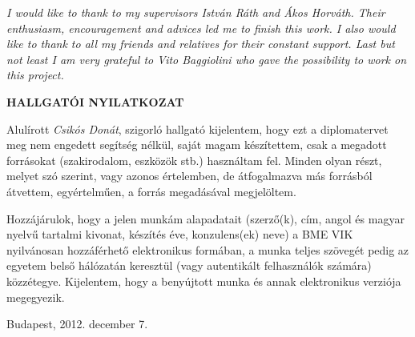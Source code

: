 \emph{I would like to thank to my supervisors István Ráth and Ákos Horváth.
 Their enthusiasm, encouragement and advices led me to finish this work.
 I also would like to thank to all my friends and relatives for their constant
 support. Last but not least I am very grateful to Vito Baggiolini who
  gave the possibility to work on this project.}
\vfill \clearpage


\begin{center} 
\large
\textbf{HALLGATÓI NYILATKOZAT}\\
\end{center}

Alulírott \emph{Csikós Donát}, szigorló hallgató kijelentem, hogy ezt a
diplomatervet meg nem  engedett segítség
nélkül, saját magam készítettem, csak a megadott forrásokat (szakirodalom,
eszközök stb.) használtam fel. Minden olyan részt, melyet szó szerint, vagy
azonos értelemben, de átfogalmazva más forrásból átvettem, egyértelműen, a
forrás megadásával megjelöltem.

Hozzájárulok, hogy a jelen munkám alapadatait (szerző(k), cím, angol és magyar
nyel\-vű tartalmi kivonat, készítés éve, konzulens(ek) neve) a BME VIK
nyilvánosan hozzáférhető elektronikus formában, a munka teljes szövegét pedig
az egyetem belső hálózatán keresztül (vagy autentikált felhasználók számára)
közzétegye. Kijelentem, hogy a benyújtott munka és annak elektronikus verziója
megegyezik.

\begin{flushleft}
\vspace*{1cm}
Budapest, 2012. december 7.
\end{flushleft}

\begin{flushright}
 \vspace*{1cm}
 \makebox[7cm]{\rule{6cm}{.4pt}}\\
 \\
\end{flushright}
\thispagestyle{empty}

\vfill
\clearpage
\thispagestyle{empty} %